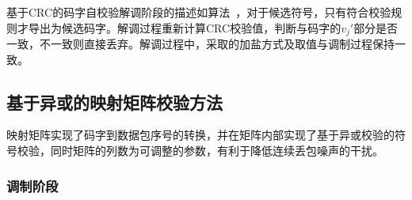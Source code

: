 基于CRC的码字自校验解调阶段的描述如算法\ ，对于候选符号，只有符合校验规则才导出为候选码字。解调过程重新计算CRC校验值，判断与码字的$v_{j}'$部分是否一致，不一致则直接丢弃。解调过程中，采取的加盐方式及取值与调制过程保持一致。

\subsection{基于异或的映射矩阵校验方法}
\label{chap:hash:robustness:xor}

映射矩阵实现了码字到数据包序号的转换，并在矩阵内部实现了基于异或校验的符号校验，同时矩阵的列数为可调整的参数，有利于降低连续丢包噪声的干扰。

\subsubsection{调制阶段}
\label{chap:hash:robustness:xor:modulation}


